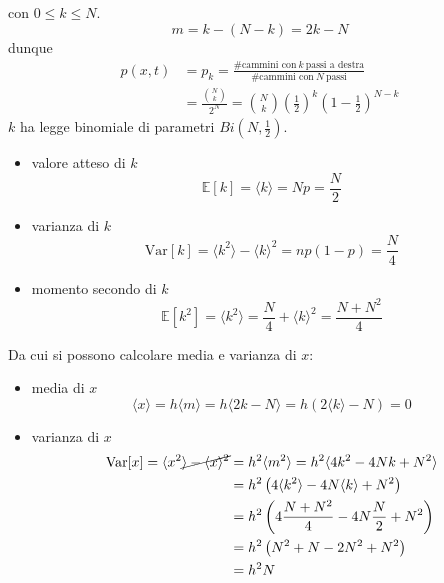 con $\displaystyle 0\leq k\leq N$.
\begin{equation*}
    m=k-(N-k) =2k-N
\end{equation*}
dunque
\begin{align*}
    p(x,t) & =p_{k} =\frac{\text{\#cammini con} \ k\ \text{passi a destra}}{\text{\#cammini con} \ N\ \text{passi}} \\
           & =\frac{\binom{N}{k}}{2^{N}} =\binom{N}{k}\left(\frac{1}{2}\right)^{k}\left(1-\frac{1}{2}\right)^{N-k}
\end{align*}
$k$ ha legge binomiale di parametri $\displaystyle Bi\left(N,\frac{1}{2}\right)$.
\begin{itemize}
    \item valore atteso di $k$
          \begin{equation*}
              \mathbb{E}[k]=\langle k\rangle =Np=\frac{N}{2}
          \end{equation*}
    \item varianza di $k$
          \begin{equation*}
              \mathrm{Var}[k]=\langle k^{2} \rangle -\langle k\rangle ^{2} =np(1-p)=\frac{N}{4}
          \end{equation*}
    \item momento secondo di $k$
          \begin{equation*}
              \mathbb{E}[k^2]=\langle k^{2} \rangle =\frac{N}{4} +\langle k\rangle ^{2} =\frac{N+N^2}{4}
          \end{equation*}
\end{itemize}

Da cui si possono calcolare media e varianza di $x$:
\begin{itemize}
    \item media di $x$
          \begin{equation*}
              \langle x\rangle =h\langle m\rangle =h\langle 2k-N\rangle =h(2\langle k\rangle -N) =0
          \end{equation*}
    \item varianza di $x$
          \begin{align*}
              \mathrm{Var}[x]=\langle x^{2} \cancel{\rangle -\langle x \rangle^2} & =h^{2} \langle m^{2} \rangle =h^{2} \langle 4k^{2} -4Nk+N^{2} \rangle \\
                                                                                  & =h^{2}\left(4\langle k^{2} \rangle -4N\langle k\rangle +N^{2}\right)  \\
                                                                                  & =h^{2}\left(4 \frac{N+N^2}{4} -4 N \frac{N}{2} + N^2 \right)          \\
                                                                                  & =h^{2}\left(N^{2} +N-2N^{2} +N^{2}\right)                             \\
                                                                                  & =h^{2} N
          \end{align*}
\end{itemize}

